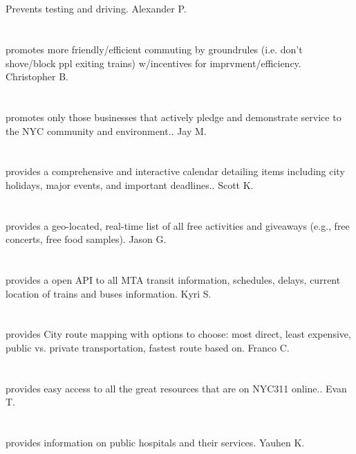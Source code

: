 \section{}Prevents testing and driving. Alexander P.
\section{}promotes more friendly/efficient commuting by groundrules (i.e. don't shove/block ppl exiting trains) w/incentives for imprvment/efficiency. Christopher B.
\section{}promotes only those businesses that actively pledge and demonstrate service to the NYC community and environment.. Jay M.
\section{}provides a comprehensive and interactive calendar detailing items including city holidays,  major events,  and important deadlines.. Scott K.
\section{}provides a geo-located,  real-time list of all free activities and giveaways (e.g.,  free concerts,  free food samples). Jason G.
\section{}provides a open API to all MTA transit information,  schedules,  delays,  current location of trains and buses  information. Kyri S.
\section{}provides City route mapping with options to choose:  most direct,  least expensive,  public vs. private transportation,  fastest route based on. Franco C.
\section{}provides easy access to all the great resources that are on NYC311 online.. Evan T.
\section{}provides information on public hospitals and their services. Yauhen K.
